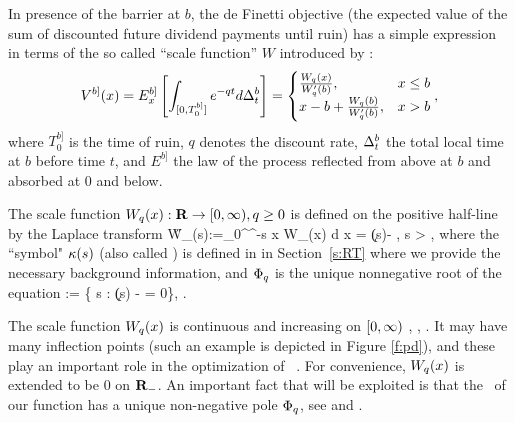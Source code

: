 In presence of the barrier at $b$, the de Finetti objective (the expected
value of the sum of discounted future dividend payments until ruin) has a
simple expression \cite{APP} in terms of the so called ``scale function''
$W$ introduced by \cite{Suprun,Ber}:
\begin{equation}
V^{b]}(x)=E^{b]}_x\le[\int_{[0,T_0^{b]}]}e^{-\q
   t}d \D_t^b \ri]= \bc \frac{W_\q( x)}{W_{\q}^ {\prime}(b)}, & x \leq
   b\\x-b + \frac{W_\q( b)}{W_{\q}^ {\prime}(b)}, & x>b\ec, \la{div}
\end{equation}
where $T_0^{b]}$ is the time of ruin, $q$ denotes the discount rate,
$\Delta_t^b$
the total local time at
$b$ before time $t$, and $E^{b]}$ the law of the process reflected from
above at $b$ and absorbed at $0$ and below.

\begin{comment}
\fn[4]{Formula \eqr{WLT}
reflects the representation $$V^{b]}(x)=E[ e^{-q \tb} ; \tb
< \tz] Eazb_b\le[\int_{[0,T_0^{b]}]}e^{-\q t}d \D_t\ri]=E[ e^{-q \tb}
; \tb < \tz]\; Eazb_b\le[ \D_{T_0^{b]} \wedge \kil_q}\ri],$$ and the fact
that the local time $\D_t$ at $b$ with reflection at $b$ is an
exponential \rv.}
\end{comment}

The scale function 
$W_{q}(x):\mathbf{R} \to [0, \infty), q \geq 0$ is defined on the positive
half-line by the Laplace transform
\be \label{WLT}
\H W_\q (s):=\int_0^\infty  {}^{-s x}  W_{\q}(x) d x =  {\k(s)-\q} , \quad \for s > \Fq,
 \ee
where the ``symbol" $\kappa(s)$ (also called \cgf) is defined in  in
Section~\ref{s:RT} where we provide the necessary background information,
and $\Phi_q$ is the unique nonnegative root of the \CL equation
\be \Fq:= \sup \{ s : \k(s)
- \q= 0\}, \quad \q {}. \label{Fq} \ee

The scale function $ W_{q}(x)$ is continuous and increasing on
$[0,\infty)$ \cite{Bingham}, \cite[Thm.~VII.8]{Ber}, \cite[Thm.~8.1]{Kyp}. It
may have \how many inflection points (such an example is depicted in
Figure \ref{f:pd}), and these play an important role in the optimization
of \divs \ \cite{APP,Schmidli,APP15}.  For convenience, $ W_{q}(x)$ is
extended to be $0$ on $\mathbf{R}_-$. An important fact that will be exploited is
that the \LT \ of our function has a unique non-negative pole $\Phi_q$,
see  and .


